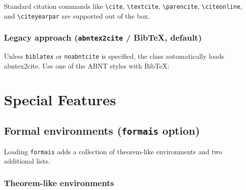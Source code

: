 \documentclass[11pt,a4paper]{article}
\newcommand{\pkg}[1]{\textsf{#1}}
\newcommand{\opt}[1]{\texttt{#1}}
\newcommand{\cmd}[1]{\texttt{\textbackslash #1}}
\begin{document}

Standard citation commands like \cmd{cite}, \cmd{textcite}, \cmd{parencite}, \cmd{citeonline}, and \cmd{citeyearpar} are supported out of the box.

\subsubsection{Legacy approach (\opt{abntex2cite} / BibTeX, default)}
Unless \opt{biblatex} or \opt{noabntcite} is specified, the class automatically loads \pkg{abntex2cite}. Use one of the ABNT styles with \textsf{BibTeX}:

\begin{latex}

\end{latex}

\section{Special Features}

\subsection{Formal environments (\opt{formais} option)}
\label{sec:formais}

Loading \opt{formais} adds a collection of theorem-like environments
and two additional lists.

\subsubsection{Theorem-like environments}
\end{document}

